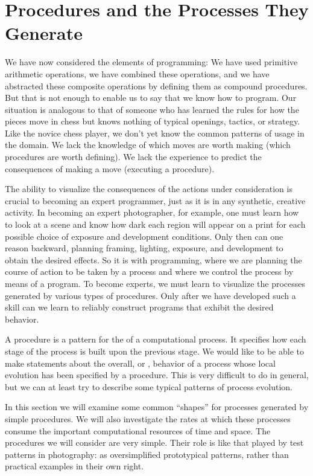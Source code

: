 \section{Procedures and the Processes They \mbox{Generate}}
\label{Section 1.2}

We have now considered the elements of programming: We have used primitive
arithmetic operations, we have combined these operations, and we have
abstracted these composite operations by defining them as compound procedures.
But that is not enough to enable us to say that we know how to program.  Our
situation is analogous to that of someone who has learned the rules for how the
pieces move in chess but knows nothing of typical openings, tactics, or
strategy.  Like the novice chess player, we don't yet know the common patterns
of usage in the domain.  We lack the knowledge of which moves are worth making
(which procedures are worth defining).  We lack the experience to predict the
consequences of making a move (executing a procedure).

The ability to visualize the consequences of the actions under consideration is
crucial to becoming an expert programmer, just as it is in any synthetic,
creative activity.  In becoming an expert photographer, for example, one must
learn how to look at a scene and know how dark each region will appear on a
print for each possible choice of exposure and development conditions.  Only
then can one reason backward, planning framing, lighting, exposure, and
development to obtain the desired effects.  So it is with programming, where we
are planning the course of action to be taken by a process and where we control
the process by means of a program.  To become experts, we must learn to
visualize the processes generated by various types of procedures.  Only after
we have developed such a skill can we learn to reliably construct programs that
exhibit the desired behavior.

A procedure is a pattern for the  of a computational
process.  It specifies how each stage of the process is built upon the previous
stage.  We would like to be able to make statements about the overall, or
, behavior of a process whose local evolution has been
specified by a procedure.  This is very difficult to do in general, but we can
at least try to describe some typical patterns of process evolution.

In this section we will examine some common ``shapes'' for processes generated
by simple procedures.  We will also investigate the rates at which these
processes consume the important computational resources of time and space.  The
procedures we will consider are very simple.  Their role is like that played by
test patterns in photography: as oversimplified prototypical patterns, rather
than practical examples in their own right.



